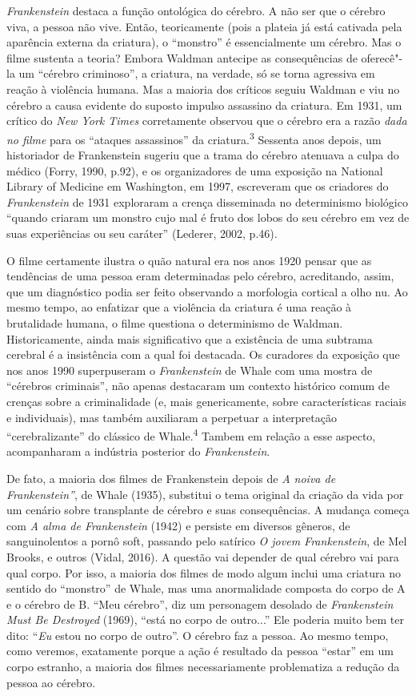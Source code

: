 \emph{Frankenstein} destaca a função ontológica do cérebro. A não ser
que o cérebro viva, a pessoa não vive. Então, teoricamente (pois a
plateia já está cativada pela aparência externa da criatura), o
``monstro'' é essencialmente um cérebro. Mas o filme sustenta a teoria?
Embora Waldman antecipe as consequências de oferecê"-la um ``cérebro
criminoso'', a criatura, na verdade, só se torna agressiva em reação à
violência humana. Mas a maioria dos críticos seguiu Waldman e viu no
cérebro a causa evidente do suposto impulso assassino da criatura. Em
1931, um crítico do \emph{New York Times} corretamente observou que o
cérebro era a razão \emph{dada no filme} para os ``ataques assassinos''
da criatura.\textsuperscript{3} Sessenta anos depois, um historiador de
Frankenstein sugeriu que a trama do cérebro atenuava a culpa do médico
(Forry, 1990, p.92), e os organizadores de uma exposição na National
Library of Medicine em Washington, em 1997, escreveram que os criadores
do \emph{Frankenstein} de 1931 exploraram a crença disseminada no
determinismo biológico ``quando criaram um monstro cujo mal é fruto dos
lobos do seu cérebro em vez de suas experiências ou seu caráter''
(Lederer, 2002, p.46).

O filme certamente ilustra o quão natural era nos anos 1920 pensar que
as tendências de uma pessoa eram determinadas pelo cérebro, acreditando,
assim, que um diagnóstico podia ser feito observando a morfologia
cortical a olho nu. Ao mesmo tempo, ao enfatizar que a violência da
criatura é uma reação à brutalidade humana, o filme questiona o
determinismo de Waldman. Historicamente, ainda mais significativo que a
existência de uma subtrama cerebral é a insistência com a qual foi
destacada. Os curadores da exposição que nos anos 1990 superpuseram o
\emph{Frankenstein} de Whale com uma mostra de ``cérebros criminais'',
não apenas destacaram um contexto histórico comum de crenças sobre a
criminalidade (e, mais genericamente, sobre características raciais e
individuais), mas também auxiliaram a perpetuar a interpretação
``cerebralizante'' do clássico de Whale.\textsuperscript{4} Tambem em
relação a esse aspecto, acompanharam a indústria posterior do
\emph{Frankenstein}.

De fato, a maioria dos filmes de Frankenstein depois de \emph{A noiva de
Frankenstein''}, de Whale (1935), substitui o tema original da criação
da vida por um cenário sobre transplante de cérebro e suas
consequências. A mudança começa com \emph{A alma de Frankenstein} (1942)
e persiste em diversos gêneros, de sanguinolentos a pornô soft, passando
pelo satírico \emph{O jovem Frankenstein}, de Mel Brooks, e outros
(Vidal, 2016). A questão vai depender de qual cérebro vai para qual
corpo. Por isso, a maioria dos filmes de modo algum inclui uma criatura
no sentido do ``monstro'' de Whale, mas uma anormalidade composta do
corpo de A e o cérebro de B. ``Meu cérebro'', diz um personagem desolado
de \emph{Frankenstein Must Be Destroyed} (1969), ``está no corpo de
outro...'' Ele poderia muito bem ter dito: ``\emph{Eu} estou no corpo de
outro''. O cérebro faz a pessoa. Ao mesmo tempo, como veremos,
exatamente porque a ação é resultado da pessoa ``estar'' em um corpo
estranho, a maioria dos filmes necessariamente problematiza a redução da
pessoa ao cérebro.

